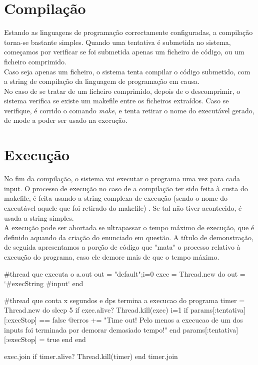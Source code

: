 \section{Compilação}\label{sec comp}

Estando as linguagens de programação correctamente configuradas, a compilação torna-se bastante simples. Quando uma tentativa
é submetida no sistema, começamos por verificar se foi submetida apenas um ficheiro de código, ou um ficheiro comprimido.\\
Caso seja apenas um ficheiro, o sistema tenta compilar o código submetido, com a string de compilação da linguagem de programação em causa.\\
No caso de se tratar de um ficheiro comprimido, depois de o descomprimir, o sistema verifica se existe um makefile entre os ficheiros extraídos. Caso se verifique, é corrido o comando \textit{make}, e tenta retirar o nome do executável gerado, de mode a poder
ser usado na execução.

\section{Execução}\label{sec exec}
No fim da compilação, o sistema vai executar o programa uma vez para cada input. O processo de execução no caso de a compilação ter
sido feita à custa do makefile, é feita usando a string complexa de execução (sendo o nome do executável aquele que foi retirado do
makefile) . Se tal não tiver acontecido, é usada a string simples.\\
A execução pode ser abortada se ultrapassar o tempo máximo de execução, que é definido aquando da criação do enunciado em
questão. A título de demonstração, de seguida apresentamos a porção de código que "mata" o processo relativo à execução do programa,
caso ele demore mais de que o tempo máximo.

\begin{haskell}
    #thread que executa o a.out 
    out = "default";i=0
    exec = Thread.new do
      out = `#{execString} #{input}`
    end
    
    #thread que conta x segundos e dps termina a execucao do programa
    timer = Thread.new do
      sleep 5
      if exec.alive?
        Thread.kill(exec)
        i=1
        if params[:tentativa][:execStop] == false
          @erros += "Time out! Pelo menos a execucao de um dos inputs foi terminada por demorar demasiado tempo!"
        end
        params[:tentativa][:execStop] = true
      end
    end
    
    exec.join
    if timer.alive?
      Thread.kill(timer)
    end
    timer.join

\end{haskell}

